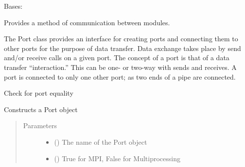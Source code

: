 \documentclass[letterpaper,10pt,openany,oneside,english]{sphinxmanual}
\begin{document}
\begin{fulllineitems}
\label{\detokenize{src_rst/port:port.Port}}
Bases: 

Provides a method of communication between modules.

The Port class provides an interface for creating ports and connecting them to
other ports for the purpose of data transfer. Data exchange takes place by
send and/or receive calls on a given port. The concept of a port is that of a data
transfer “interaction.” This can be one- or two-way with sends and receives.
A port is connected to only one other port; as two ends of a pipe are connected.

\begin{fulllineitems}
\label{\detokenize{src_rst/port:port.Port.__eq__}}
Check for port equality

\end{fulllineitems}


\begin{fulllineitems}
\label{\detokenize{src_rst/port:port.Port.__init__}}
Constructs a Port object
\begin{quote}\begin{description}
\item[{Parameters}] \leavevmode\begin{itemize}
\item {} 
 () \textendash{} The name of the Port object

\item {} 
 () \textendash{} True for MPI, False for Multiprocessing

\end{itemize}


\end{description}
\end{quote}
\end{fulllineitems}
\end{fulllineitems}
\end{document}
